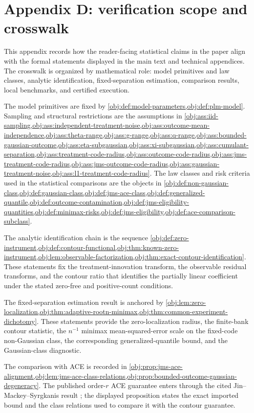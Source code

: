 \section{Appendix D: verification scope and crosswalk}

This appendix records how the reader-facing statistical claims in the paper align with the formal statements displayed in the main text and technical appendices. The crosswalk is organized by mathematical role: model primitives and law classes, analytic identification, fixed-separation estimation, comparison results, local benchmarks, and certified execution.

The model primitives are fixed by \cref{obj:def:model-parameters,obj:def:plm-model}. Sampling and structural restrictions are the assumptions in \cref{obj:ass:iid-sampling,obj:ass:independent-treatment-noise,obj:ass:outcome-mean-independence,obj:ass:theta-range,obj:ass:g-range,obj:ass:q-range,obj:ass:bounded-gaussian-outcome,obj:ass:eta-subgaussian,obj:ass:xi-subgaussian,obj:ass:cumulant-separation,obj:ass:treatment-code-radius,obj:ass:outcome-code-radius,obj:ass:jms-treatment-code-radius,obj:ass:jms-outcome-code-radius,obj:ass:gaussian-treatment-noise,obj:ass:l1-treatment-code-radius}. The law classes and risk criteria used in the statistical comparisons are the objects in \cref{obj:def:non-gaussian-class,obj:def:gaussian-class,obj:def:jms-ace-class,obj:def:generalized-quantile,obj:def:outcome-contamination,obj:def:jms-eligibility-quantities,obj:def:minimax-risks,obj:def:jms-eligibility,obj:def:ace-comparison-subclass}.

The analytic identification chain is the sequence \cref{obj:def:zero-instrument,obj:def:contour-functional,obj:thm:known-zero-instrument,obj:lem:observable-factorization,obj:thm:exact-contour-identification}. These statements fix the treatment-innovation transform, the observable residual transforms, and the contour ratio that identifies the partially linear coefficient under the stated zero-free and positive-count conditions.

The fixed-separation estimation result is anchored by \cref{obj:lem:zero-localization,obj:thm:adaptive-rootn-minimax,obj:thm:common-experiment-dichotomy}. These statements provide the zero-localization radius, the finite-bank contour statistic, the \(n^{-1}\) minimax mean-squared-error scale on the fixed-code non-Gaussian class, the corresponding generalized-quantile bound, and the Gaussian-class diagnostic.

The comparison with ACE is recorded in \cref{obj:prop:jms-ace-alignment,obj:lem:jms-ace-class-relations,obj:prop:bounded-outcome-gaussian-degeneracy}. The published order-\(r\) ACE guarantee enters through the cited Jin--Mackey--Syrgkanis result \citep{JinMackeySyrgkanis2025}; the displayed proposition states the exact imported bound and the class relations used to compare it with the contour guarantee.

